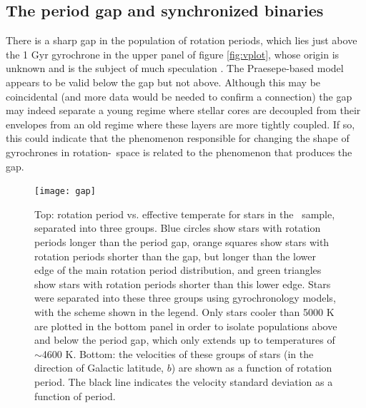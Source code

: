 \subsection{The period gap and synchronized binaries}
\label{sec:gap}

There is a sharp gap in the population of rotation periods, which lies just
above the 1 Gyr gyrochrone in the upper panel of figure \ref{fig:vplot}, whose
origin is unknown and is the subject of much speculation \citep{mcquillan2014,
davenport2018, reinhold2019}.
The Praesepe-based model appears to be valid below the gap but not above.
Although this may be coincidental (and more data would be needed to confirm a
connection) the gap may indeed separate a young regime where stellar cores are
decoupled from their envelopes from an old regime where these layers are more
tightly coupled.
If so, this could indicate that the phenomenon responsible for changing the
shape of gyrochrones in rotation-\teff\ space is related to the phenomenon that
produces the gap.

\begin{figure}
  \caption{
      Top: rotation period vs. effective temperate for stars in the \mct\
    sample, separated into three groups. Blue circles
      show stars with rotation periods longer than the
    period gap, orange squares show stars with rotation periods shorter than
    the gap, but longer than the lower edge of the main rotation period
    distribution, and green triangles show stars with rotation periods shorter
    than this lower edge.
    Stars were separated into these three groups using \citet{angus2019}
    gyrochronology models, with the scheme shown in the legend.
    Only stars cooler than 5000 K are plotted in
    the bottom panel in order to isolate populations above and below the
    period gap, which only extends up to temperatures of $\sim$4600 K.
    Bottom: the velocities of these groups of stars (in the direction of
    Galactic latitude, $b$) are shown as a function of rotation period.
    The black line indicates the velocity standard deviation as a function of
    period.
}
  \centering
    \texttt{[image: gap]}
\label{fig:gap}
\end{figure}

